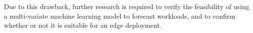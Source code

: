 Due to this drawback, further research is required to verify the feasibility of using a multi-variate machine learning model to forecast workloads, and to confirm whether or not it is suitable for an edge deployment.

